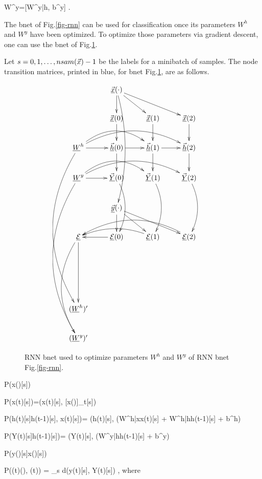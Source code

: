 \beq
W^y=[W^{y|h}, b^y]
\;.
\eeq

The bnet of Fig.\ref{fig-rnn}
can be used for
classification once 
its parameters 
$W^h$ and $W^y$
have been optimized.
To optimize
those parameters via gradient
descent,
one can use the bnet 
of Fig.\ref{fig-rnn-ext}.

Let $s=0,1, \ldots, nsam({\vec{x}})-1$
be the labels for a minibatch of samples.
The node transition matrices,
 printed in blue,
for bnet Fig.\ref{fig-rnn-ext},
 are as follows.



\begin{figure}[h!]
\centering
$$\xymatrix{
&\ranvec{x}(\cdot)\ar[d]\ar[dr]\ar[drr]
\ar@/^1pc/[dddd]
\\
&\vec{\rvx}(0)\ar[d]&
\vec{\rvx}(1)\ar[d]&
\vec{\rvx}(2)\ar[d]\\
\rvW^h\ar[r]\ar@/^2pc/[rr]\ar@/^2pc/[rrr]
\ar@/_3pc/[dddddd]
&\vec{\rvh}(0)\ar[d]\ar[r]&
\vec{\rvh}(1)\ar[d]\ar[r]&
\vec{\rvh}(2)\ar[d]\\
\rvW^y\ar[r]\ar@/^2pc/[rr]\ar@/^2pc/[rrr]
\ar@/_3pc/[dddddd]
&\vec{\rvY}(0)\ar@/^1pc/[dd]&
\vec{\rvY}(1)\ar@/^1pc/[dd]&
\vec{\rvY}(2)\ar@/^1pc/[dd]
\\
&
\ranvec{y}(\cdot)\ar[d]\ar[dr]\ar[drr]
\\
\ul{\cale}\ar[ddd]
\ar@/_2pc/[dddd]&
\ul{\cale}(0)\ar[l]&
\ul{\cale}(1)\ar@/_1pc/[ll]&
\ul{\cale}(2)\ar@/_2pc/[lll]
\\
\\
\\
(\rvW^h)'\\
(\rvW^y)'
}
$$
\caption{RNN bnet used
to optimize parameters $W^h$
and $W^y$ of RNN bnet Fig.\ref{fig-rnn}.}
\label{fig-rnn-ext}
\end{figure}

\beq\color{blue}
P(x(\cdot)[s])
\eeq

\beq\color{blue}
P(x(t)[s])=\delta(x(t)[s], 
[x(\cdot)]_t[s])
\eeq

\beq\color{blue}
P(h(t)[s]\cond h(t-1)[s], x(t)[s])=
\delta(h(t)[s],
\cala(W^{h|x}x(t)[s] + W^{h|h}h(t-1)[s] + b^h)
\eeq

\beq\color{blue}
P(Y(t)[s]\cond h(t-1)[s])=
\delta(Y(t)[s],
\cala(W^{y|h}h(t-1)[s] + b^y)
\eeq

\beq\color{blue}
P(y(\cdot)[s]\cond x(\cdot)[s])
\eeq

\beq\color{blue}
P(\cale(t)\cond \vecy(\cdot), (t))
=
\sum_s d(y(t)[s], Y(t)[s])
\;,
\eeq
where 

